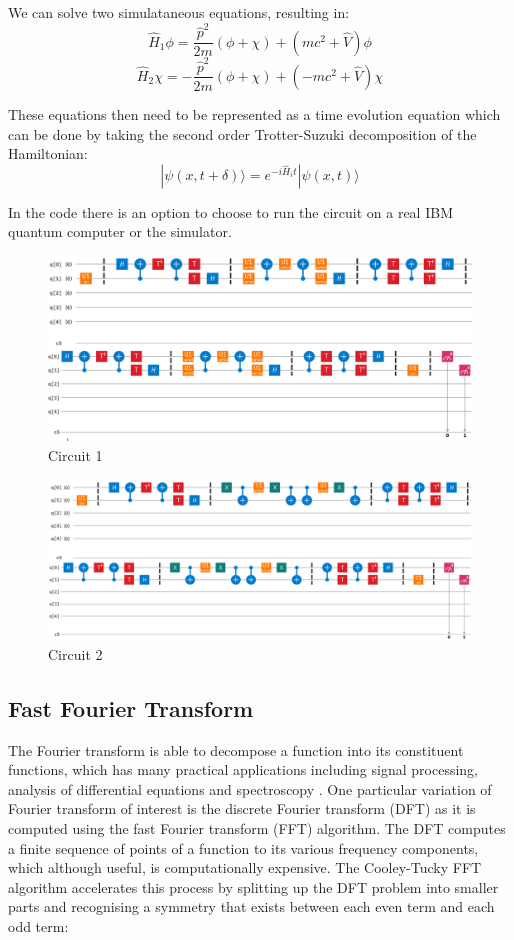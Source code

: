 \documentclass{article}
\begin{document}
\noindent We can solve two simulataneous equations, resulting in:
\[\hat{H}_{1} \phi=\frac{\hat{p}^2}{2m}(\phi+\chi)+(mc^2+\hat{V}) \phi\]
\[\hat{H}_{2} \chi=-\frac{\hat{p}^2}{2m}(\phi+\chi)+(-mc^2+\hat{V}) \chi\]

\noindent These equations then need to be represented as a time evolution equation which can be done by taking the second order Trotter-Suzuki decomposition of the Hamiltonian:
\[|\psi(x, t+\delta)\rangle= e^{-i \hat{H}_{i} t}|\psi(x, t)\rangle\]

In the code there is an option to choose to run the circuit on a real IBM quantum computer or the simulator.

\begin{figure}[!htb]
\includegraphics[scale=0.42]{../images/circuit1_colour}
  \centering
  \caption{Circuit 1 }
\end{figure}

\begin{figure}[!htb]
\includegraphics[scale=0.34]{../images/circuit2_colour}
  \centering
  \caption{Circuit 2}
\end{figure}

\subsection{Fast Fourier Transform}
The Fourier transform is able to decompose a function into its constituent functions, which has many practical applications including signal processing, analysis of differential equations and spectroscopy \cite{fourier}. One particular variation of Fourier transform of interest is the discrete Fourier transform (DFT) as it is computed using the fast Fourier transform (FFT) algorithm. The DFT computes a finite sequence of points of a function to its various frequency components, which although useful, is computationally expensive. The Cooley-Tucky \cite{turkey} FFT algorithm accelerates this process by splitting up the DFT problem into smaller parts and recognising a symmetry that exists between each even term and each odd term:
\end{document}
